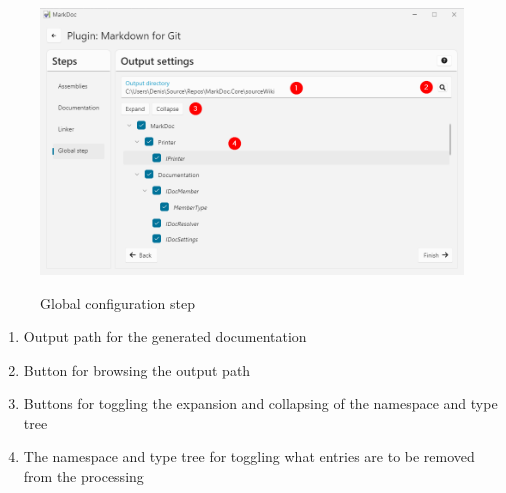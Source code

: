 \begin{figure}[H]
    \caption{Global configuration step}
    \includegraphics[width=\linewidth]{img/pluginGlobal.png}
    \label{fig:pluginGlobal}
\end{figure}

\begin{enumerate}
    \item Output path for the generated documentation
    \item Button for browsing the output path
    \item Buttons for toggling the expansion and collapsing of the namespace and type tree
    \item The namespace and type tree for toggling what entries are to be removed from the processing
\end{enumerate}